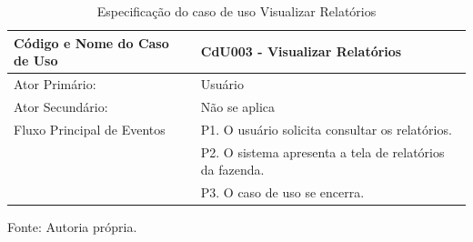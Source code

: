 \begin{apendicesenv}
\begin{table}[!h]
	\begin{center}
		\caption{Especificação do caso de uso Visualizar Relatórios}
		\begin{tabular}{ | l |  p{10cm} |}
			\hline
			Código e Nome do Caso de Uso & CdU003 - Visualizar Relatórios \\ \hline
			Ator Primário: & Usuário \\
			Ator Secundário: & Não se aplica \\ \hline
			Fluxo Principal de Eventos & P1. O usuário solicita consultar os relatórios. \\
						   & P2. O sistema apresenta a tela de relatórios da fazenda. \\
						   & P3. O caso de uso se encerra. \\
			\hline
		\end{tabular}
		Fonte: Autoria própria.
	\end{center}
\end{table}

\newpage


\end{apendicesenv}
